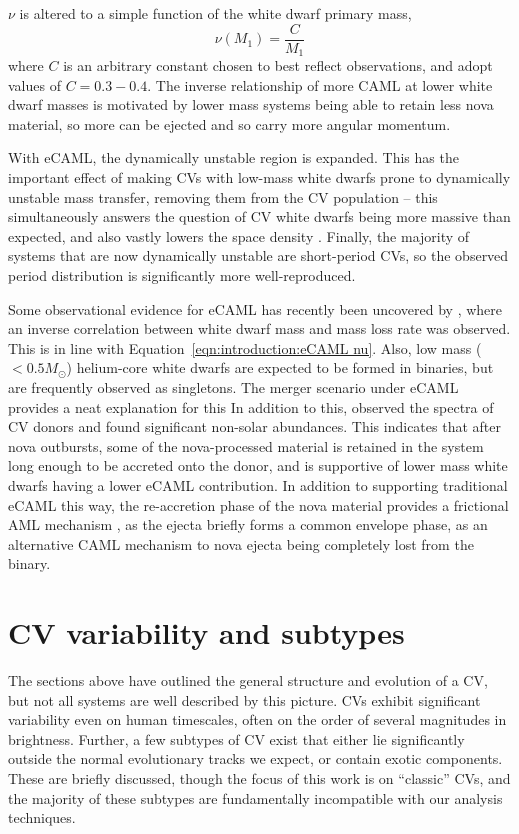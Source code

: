 $\nu$ is altered to a simple function of the white dwarf primary mass,
\begin{equation}
    \label{eqn:introduction:eCAML nu}
    \nu (M_1) = \frac{C}{M_1}
\end{equation}
where $C$ is an arbitrary constant chosen to best reflect observations, and \citep{Schreiber2016} adopt values of $C = 0.3 - 0.4$. The inverse relationship of more CAML at lower white dwarf masses is motivated by lower mass systems being able to retain less nova material, so more can be ejected and so carry more angular momentum. 

With eCAML, the dynamically unstable region  is expanded. This has the important effect of making CVs with low-mass white dwarfs prone to dynamically unstable mass transfer, removing them from the CV population -- this simultaneously answers the question of CV white dwarfs being more massive than expected, and also vastly lowers the space density \citep{belloni2018}. Finally, the majority of systems that are now dynamically unstable are short-period CVs, so the observed period distribution is significantly more well-reproduced. 

Some observational evidence for eCAML has recently been uncovered by \citet{Pala2021}, where an inverse correlation between white dwarf mass and mass loss rate was observed. This is in line with Equation~\ref{eqn:introduction:eCAML nu}. 
Also, low mass ($< 0.5 M_\odot$) helium-core white dwarfs are expected to be formed in binaries, but are frequently observed as singletons. The merger scenario under eCAML provides a neat explanation for this \citep{zorotovic2017}
In addition to this, \citet{sparks2021} observed the spectra of CV donors and found significant non-solar abundances. This indicates that after nova outbursts, some of the nova-processed material is retained in the system long enough to be accreted onto the donor, and is supportive of lower mass white dwarfs having a lower eCAML contribution. In addition to supporting traditional eCAML this way, the re-accretion phase of the nova material provides a frictional AML mechanism \citep{Schreiber2016,sparks2021}, as the ejecta briefly forms a common envelope phase, as an alternative CAML mechanism to nova ejecta being completely lost from the binary. 



\section{CV variability and subtypes}
The sections above have outlined the general structure and evolution of a CV, but not all systems are well described by this picture. CVs exhibit significant variability even on human timescales, often on the order of several magnitudes in brightness. Further, a few subtypes of CV exist that either lie significantly outside the normal evolutionary tracks we expect, or contain exotic components. These are briefly discussed, though the focus of this work is on ``classic'' CVs, and the majority of these subtypes are fundamentally incompatible with our analysis techniques.

